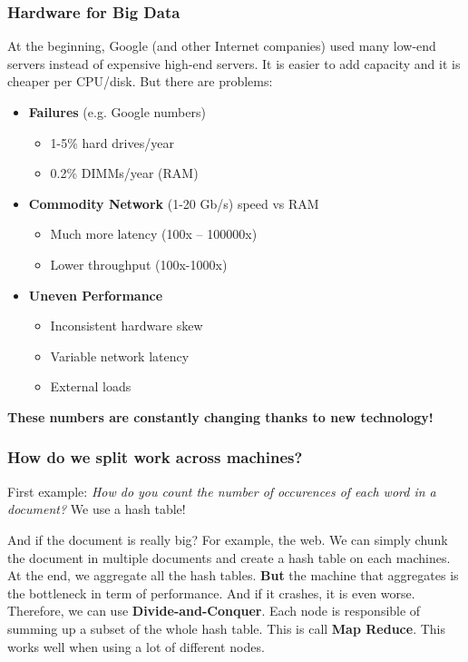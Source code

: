 \subsubsection{Hardware for Big Data}
At the beginning, Google (and other Internet companies) used many low-end servers instead of expensive high-end servers. It is easier to add capacity and it is cheaper per CPU/disk. But there are problems:
\begin{itemize}
 \item {\bf Failures} (e.g. Google numbers)
 \begin{itemize}
  \item 1-5\% hard drives/year
  \item 0.2\% DIMMs/year (RAM)
 \end{itemize}
 \item {\bf Commodity Network} (1-20 Gb/s) speed vs RAM
 \begin{itemize}
  \item Much more latency (100x -- 100000x)
  \item Lower throughput (100x-1000x)
 \end{itemize}
 \item {\bf Uneven Performance}
 \begin{itemize}
  \item Inconsistent hardware skew
  \item Variable network latency
  \item External loads
 \end{itemize}
\end{itemize}

\begin{center}
{\bf These numbers are constantly changing thanks to new technology!}
\end{center}

\subsubsection{How do we split work across machines?}

First example: \emph{How do you count the number of occurences of each word in a document?} We use a hash table!

And if the document is really big? For example, the web. We can simply chunk the document in multiple documents and create a hash table on each machines. At the end, we aggregate all the hash tables. {\bf But} the machine that aggregates is the bottleneck in term of performance. And if it crashes, it is even worse. Therefore, we can use {\bf Divide-and-Conquer}. Each node is responsible of summing up a subset of the whole hash table. This is call {\bf Map Reduce}. This works well when using a lot of different nodes.

